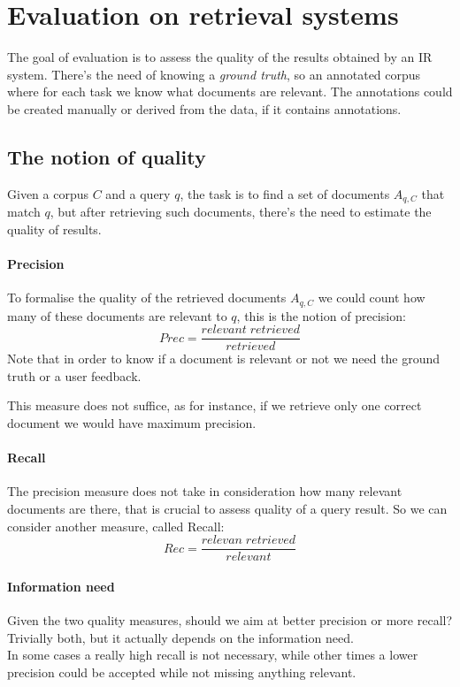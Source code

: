 \section{Evaluation on retrieval systems}

The goal of evaluation is to assess the quality of the results 
obtained by an IR system.
There's the need of knowing a \emph{ground truth}, so an annotated corpus 
where for each task we know what documents are relevant. The annotations
could be created manually or derived from the data, if it contains 
annotations.

\subsection{The notion of quality}
Given a corpus $C$ and a query $q$, the task is to find a set of 
documents $A_{q,C}$ that match $q$, but after retrieving such documents, 
there's the need to estimate the quality of results.

\paragraph{Precision}
To formalise the quality of the retrieved documents $A_{q,C}$ we could 
count how many of these documents are relevant to $q$, this 
is the notion of precision:
$$\mathit{Prec} = \frac{\mathit{relevant\;retrieved}}{\mathit{retrieved}}$$
Note that in order to know if a document is relevant or not we need the 
ground truth or a user feedback.

This measure does not suffice, as for instance, if we retrieve 
only one correct document we would have maximum precision.

\paragraph{Recall}
The precision measure does not take in consideration how many relevant 
documents are there, that is crucial to assess quality of a query result.
So we can consider another measure, called Recall:
$$\mathit{Rec} = \frac{\mathit{relevan\;retrieved}}{\mathit{relevant}}$$

\paragraph{Information need}
Given the two quality measures, should we aim at better precision or more 
recall? Trivially both, but it actually depends on the information need.\\
In some cases a really high recall is not necessary, while other times
a lower precision could be accepted while not missing anything relevant.


